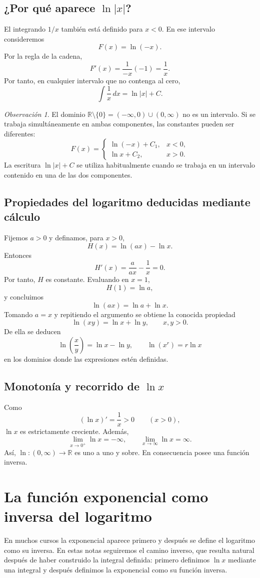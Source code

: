 \documentclass[12pt]{article}
\theoremstyle{definition}
\theoremstyle{remark}
\newtheorem*{observacion}{Observación}
\newcommand{\R}{\mathbb{R}}
\begin{document}
\subsection*{¿Por qué aparece $\ln|x|$?}
El integrando $1/x$ también está definido para $x<0$. En ese intervalo consideremos
\[
F(x)=\ln(-x).
\]
Por la regla de la cadena,
\[
F'(x)=\frac{1}{-x}(-1)=\frac1x.
\]
Por tanto, en cualquier intervalo que no contenga al cero,
\[
\boxed{\int\frac1x\,dx=\ln|x|+C.}
\]
\begin{observacion}
El dominio $\R\setminus\{0\}=(-\infty,0)\cup(0,\infty)$ no es un intervalo. Si se trabaja simultáneamente en ambas componentes, las constantes pueden ser diferentes:
\[
F(x)=\begin{cases}
\ln(-x)+C_1,&x<0,\\[1mm]
\ln x+C_2,&x>0.
\end{cases}
\]
La escritura $\ln|x|+C$ se utiliza habitualmente cuando se trabaja en un intervalo contenido en una de las dos componentes.
\end{observacion}

\subsection*{Propiedades del logaritmo deducidas mediante cálculo}
Fijemos $a>0$ y definamos, para $x>0$,
\[
H(x)=\ln(ax)-\ln x.
\]
Entonces
\[
H'(x)=\frac{a}{ax}-\frac1x=0.
\]
Por tanto, $H$ es constante. Evaluando en $x=1$,
\[
H(1)=\ln a,
\]
y concluimos
\[
\boxed{\ln(ax)=\ln a+\ln x.}
\]
Tomando $a=x$ y repitiendo el argumento se obtiene la conocida propiedad
\[
\boxed{\ln(xy)=\ln x+\ln y,\qquad x,y>0.}
\]
De ella se deducen
\[
\ln\left(\frac{x}{y}\right)=\ln x-\ln y,
\qquad
\ln(x^r)=r\ln x
\]
en los dominios donde las expresiones estén definidas.

\subsection*{Monotonía y recorrido de $\ln x$}
Como
\[
(\ln x)'=\frac1x>0\qquad(x>0),
\]
$\ln x$ es estrictamente creciente. Además,
\[
\lim_{x\to0^+}\ln x=-\infty,
\qquad
\lim_{x\to\infty}\ln x=\infty.
\]
Así, $\ln:(0,\infty)\to\R$ es uno a uno y sobre. En consecuencia posee una función inversa.
\section{La función exponencial como inversa del logaritmo}
En muchos cursos la exponencial aparece primero y después se define el logaritmo como su inversa. En estas notas seguiremos el camino inverso, que resulta natural después de haber construido la integral definida: primero definimos $\ln x$ mediante una integral y después definimos la exponencial como su función inversa.
\end{document}
